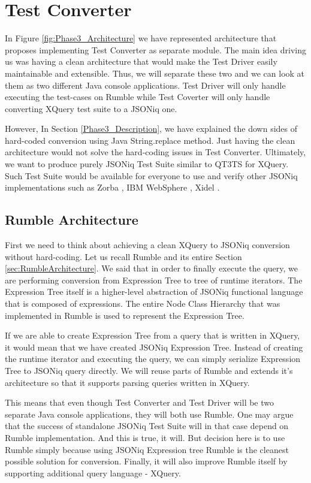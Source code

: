 
\chapter{Test Converter}
In Figure \ref{fig:Phase3_Architecture} we have represented architecture that proposes implementing Test Converter as separate module. The main idea driving us was having a clean architecture that would make the Test Driver easily maintainable and extensible. Thus, we will separate these two and we can look at them as two different Java console applications. Test Driver will only handle executing the test-cases on Rumble while Test Coverter will only handle converting XQuery test suite to a JSONiq one. 

However, In Section \ref{Phase3_Description}, we have explained the down sides of hard-coded conversion using Java String.replace method. Just having the clean architecture would not solve the hard-coding issues in Test Converter. Ultimately, we want to produce purely JSONiq Test Suite similar to QT3TS for XQuery. Such Test Suite would be available for everyone to use and verify other JSONiq implementations such as Zorba \cite{Zorba}, IBM WebSphere \cite{WebSphere}, Xidel \cite{Xidel}.

\section{Rumble Architecture}
First we need to think about achieving a clean XQuery to JSONiq conversion without hard-coding. Let us recall Rumble and its entire Section \ref{sec:RumbleArchitecture}. We said that in order to finally execute the query, we are performing conversion from Expression Tree to tree of runtime iterators. The Expression Tree itself is a higher-level abstraction of JSONiq functional language that is composed of expressions. The entire Node Class Hierarchy that was implemented in Rumble is used to represent the Expression Tree.

If we are able to create Expression Tree from a query that is written in XQuery, it would mean that we have created JSONiq Expression Tree. Instead of creating the runtime iterator and executing the query, we can simply serialize Expression Tree to JSONiq query directly. We will reuse parts of Rumble and extends it's architecture so that it supports parsing queries written in XQuery. 

This means that even though Test Converter and Test Driver will be two separate Java console applications, they will both use Rumble. One may argue that the success of standalone JSONiq Test Suite will in that case depend on Rumble implementation. And this is true, it will. But decision here is to use Rumble simply because using JSONiq Expression tree Rumble is the cleanest possible solution for conversion. Finally, it will also improve Rumble itself by supporting additional query language - XQuery.

